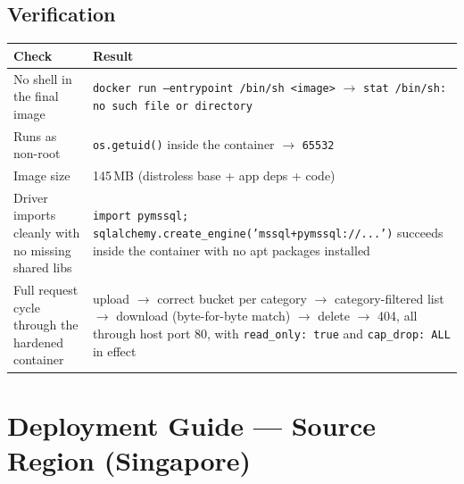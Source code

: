 \documentclass[10pt]{article}
\begin{document}
\subsection{Verification}

\noindent \begin{tabularx}{\textwidth}{@{}p{4.2cm} X@{}}
\toprule
\rowcolor{tableHead} \textbf{Check} & \textbf{Result} \\
\midrule
No shell in the final image & \texttt{docker run --entrypoint /bin/sh <image>} $\to$ \texttt{stat /bin/sh: no such file or directory} \\
\rowcolor{tableAlt} Runs as non-root & \texttt{os.getuid()} inside the container $\to$ \texttt{65532} \\
Image size & 145\,MB (distroless base + app deps + code) \\
\rowcolor{tableAlt} Driver imports cleanly with no missing shared libs & \texttt{import pymssql; sqlalchemy.create\_engine('mssql+pymssql://...')} succeeds inside the container with no apt packages installed \\
Full request cycle through the hardened container & upload $\to$ correct bucket per category $\to$ category-filtered list $\to$ download (byte-for-byte match) $\to$ delete $\to$ 404, all through host port 80, with \texttt{read\_only: true} and \texttt{cap\_drop: ALL} in effect \\
\bottomrule
\end{tabularx}

\section[Deployment Guide]{Deployment Guide --- Source Region (Singapore)}
\label{sec:deploy}
\end{document}
